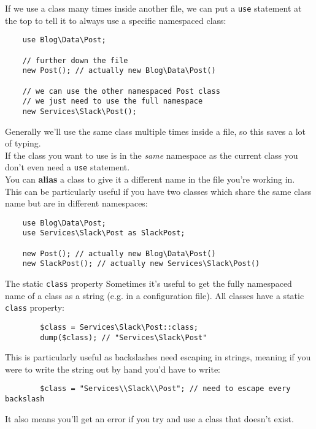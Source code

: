 \pagebreak

If we use a class many times inside another file, we can put a \texttt{use} statement at the top to tell it to always use a specific namespaced class:

\begin{verbatim}
    use Blog\Data\Post;

    // further down the file
    new Post(); // actually new Blog\Data\Post()

    // we can use the other namespaced Post class
    // we just need to use the full namespace
    new Services\Slack\Post();
\end{verbatim}

Generally we'll use the same class multiple times inside a file, so this saves a lot of typing.
\\

If the class you want to use is in the \textit{same} namespace as the current class you don't even need a \texttt{use} statement.
\\

You can \textbf{alias} a class to give it a different name in the file you're working in. This can be particularly useful if you have two classes which share the same class name but are in different namespaces:

\begin{verbatim}
    use Blog\Data\Post;
    use Services\Slack\Post as SlackPost;

    new Post(); // actually new Blog\Data\Post()
    new SlackPost(); // actually new Services\Slack\Post()
\end{verbatim}


\pagebreak

\begin{infobox}{The static \texttt{class} property}
    Sometimes it's useful to get the fully namespaced name of a class as a string (e.g. in a configuration file). All classes have a static \texttt{class} property:

    \begin{verbatim}
        $class = Services\Slack\Post::class;
        dump($class); // "Services\Slack\Post"
    \end{verbatim}

    This is particularly useful as backslashes need escaping in strings, meaning if you were to write the string out by hand you'd have to write:

    \begin{verbatim}
        $class = "Services\\Slack\\Post"; // need to escape every backslash
    \end{verbatim}

    It also means you'll get an error if you try and use a class that doesn't exist.
\end{infobox}





